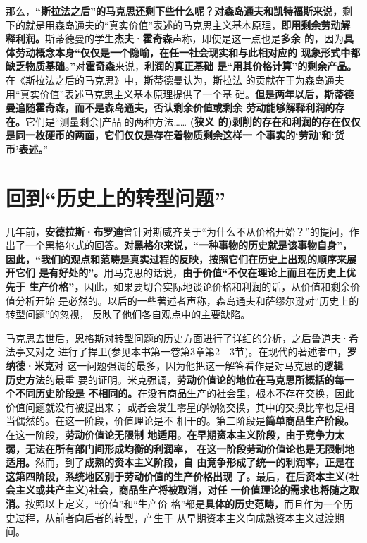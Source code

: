 那么，\textbf{“斯拉法之后”的马克思还剩下些什么呢？对森岛通夫和凯特福斯来说，}剩
下的就是用森岛通夫的“真实价值”表述的马克思主义基本原理，\textbf{即用剩余劳动解
  释利润。}斯蒂德曼的学生\textbf{杰夫·霍奇森}声称，即使是这一点也是\textbf{多余
  的}，因为\textbf{具体劳动概念本身“仅仅是一个隐喻，在任一社会现实和与此相对应的
  现象形式中都缺乏物质基础。”}对\textbf{霍奇森}来说，\textbf{利润的真正基础
  是“用其价格计算”的剩余产品。}在《斯拉法之后的马克思》中，斯蒂德曼认为，斯拉法
的贡献在于为森岛通夫用“真实价值”表述马克思主义基本原理提供了一个基
础。\textbf{但是两年以后，斯蒂德曼追随霍奇森，而不是森岛通夫，否认剩余价值或剩余
  劳动能够解释利润的存在。}它们是“测量剩余[产品]的两种方法…… \textbf{(狭义
  的)剥削的存在和利润的存在仅仅是同一枚硬币的两面，它们仅仅是存在着物质剩余这样一
  个事实的‘劳动’和‘货币’表述。}”

\section{回到“历史上的转型问题”}

几年前，\textbf{安德拉斯·布罗迪}曾针对斯威齐关于“为什么不从价格开始？”的提问，作
出了一个黑格尔式的回答。\textbf{对黑格尔来说，“一种事物的历史就是该事物自身”，
  因此，“我们的观点和范畴是真实过程的反映，按照它们在历史上出现的顺序来展开它们
  是有好处的”。}用马克思的话说，\textbf{由于价值“不仅在理论上而且在历史上优先于
  生产价格”，}因此，如果要切合实际地谈论价格和利润的话，从价值和剩余价值分析开始
是必然的。以后的一些著述者声称，森岛通夫和萨缪尔逊对“历史上的转型问题”的忽视，
反映了他们各自观点中的主要缺陷。

马克思去世后，恩格斯对转型问题的历史方面进行了详细的分析，之后鲁道夫·希法亭又对之
进行了捍卫(参见本书第一卷第3章第2—3节)。在现代的著述者中，\textbf{罗纳德·米克}对
这一问题强调的最多，因为他把这一解答看作是对马克思的\textbf{逻辑—历史方法}的最重
要的证明。米克强调，\textbf{劳动价值论的地位在马克思所概括的每一个不同历史阶段是
  不相同的。}在没有商品生产的社会里，根本不存在交换，因此价值问题就没有被提出来；
或者会发生零星的物物交换，其中的交换比率也是相当偶然的。在这一阶段，价值理论是不
相干的。第二阶段是\textbf{简单商品生产阶段。}在这一阶段，\textbf{劳动价值论无限制
  地适用。在早期资本主义阶段，由于竞争力太弱，无法在所有部门间形成均衡的利润率，
  在这一阶段劳动价值论也是无限制地适用。}然而，到了\textbf{成熟的资本主义阶段，自
  由竞争形成了统一的利润率，正是在这第四阶段，系统地区别于劳动价值的生产价格出现
  了。}最后，\textbf{在后资本主义(社会主义或共产主义)社会，商品生产将被取消，对任
  一价值理论的需求也将随之取消。}按照以上定义，“价值”和“生产价
格”都是\textbf{具体的历史范畴，}而且作为一个历史过程，从前者向后者的转型，产生于
从早期资本主义向成熟资本主义过渡期间。

